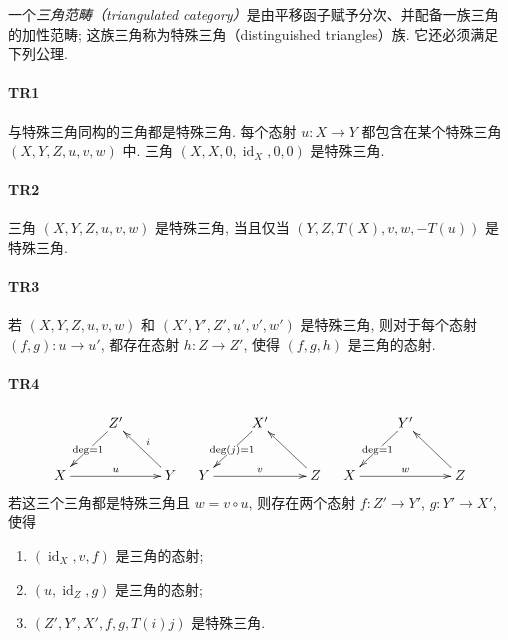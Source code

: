 \subsubsection{}\label{VIII:1-1-1}

一个\emph{三角范畴（triangulated category）}是由平移函子赋予分次、并配备一族三角的加性范畴; 这族三角称为特殊三角（distinguished triangles）族. 它还必须满足下列公理.

\paragraph{TR1}
\hypertarget{VIII:TR1}{}

与特殊三角同构的三角都是特殊三角. 每个态射 $u:X\to Y$ 都包含在某个特殊三角 $(X,Y,Z,u,v,w)$ 中. 三角 $(X,X,0,\operatorname{id}_X,0,0)$ 是特殊三角.

\paragraph{TR2}
\hypertarget{VIII:TR2}{}

三角 $(X,Y,Z,u,v,w)$ 是特殊三角, 当且仅当 $(Y,Z,T(X),v,w,-T(u))$ 是特殊三角.

\paragraph{TR3}
\hypertarget{VIII:TR3}{}

若 $(X,Y,Z,u,v,w)$ 和 $(X',Y',Z',u',v',w')$ 是特殊三角, 则对于每个态射 $(f,g):u\to u'$, 都存在态射 $h:Z\to Z'$, 使得 $(f,g,h)$ 是三角的态射.

\paragraph{TR4}
\hypertarget{VIII:TR4}{}

\[\xymatrix{
  & Z' \ar[dl]|{\deg=1} \\
  X \ar[rr]^-u
    & & Y \ar[ul]_-i
}\quad
\xymatrix{
  & X' \ar[dl]|{\deg(j)=1} \\
  Y \ar[rr]^-v
    & & Z \ar[ul]
}\quad
\xymatrix{
  & Y' \ar[dl]|{\deg=1} \\
  X \ar[rr]^-w
    & & Z \ar[ul]
}\]
若这三个三角都是特殊三角且 $w=v\circ u$, 则存在两个态射 $f:Z'\to Y'$, $g:Y' \to X'$, 使得
\begin{enumerate}
  \item $(\operatorname{id}_X, v, f)$ 是三角的态射;
  \item $(u,\operatorname{id}_Z,g)$ 是三角的态射;
  \item $(Z',Y',X',f,g,T(i) j)$ 是特殊三角.
\end{enumerate}

